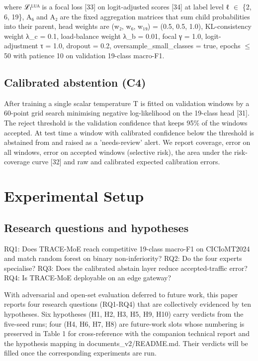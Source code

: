 \documentclass[11pt]{article}
\begin{document}
where ℒₗᴸᵁᴬ is a focal loss [33] on logit-adjusted scores [34] at label level ℓ $\in$ \{2, 6, 19\}, A₆ and A₂ are the fixed aggregation matrices that sum child probabilities into their parent, head weights are (w₂, w₆, w₁₉) = (0.5, 0.5, 1.0), KL-consistency weight λ\_c = 0.1, load-balance weight λ\_b = 0.01, focal γ = 1.0, logit-adjustment τ = 1.0, dropout = 0.2, oversample\_small\_classes = true, epochs $\leq$ 50 with patience 10 on validation 19-class macro-F1.

\subsection{Calibrated abstention (C4)}
After training a single scalar temperature T is fitted on validation windows by a 60-point grid search minimising negative log-likelihood on the 19-class head [31]. The reject threshold is the validation confidence that keeps 95\% of the windows accepted. At test time a window with calibrated confidence below the threshold is abstained from and raised as a 'needs-review' alert. We report coverage, error on all windows, error on accepted windows (selective risk), the area under the risk-coverage curve [32] and raw and calibrated expected calibration errors.

\section{Experimental Setup}
\subsection{Research questions and hypotheses}
RQ1: Does TRACE-MoE reach competitive 19-class macro-F1 on CICIoMT2024 and match random forest on binary non-inferiority? RQ2: Do the four experts specialise? RQ3: Does the calibrated abstain layer reduce accepted-traffic error? RQ4: Is TRACE-MoE deployable on an edge gateway?

With adversarial and open-set evaluation deferred to future work, this paper reports four research questions (RQ1-RQ4) that are collectively evidenced by ten hypotheses. Six hypotheses (H1, H2, H3, H5, H9, H10) carry verdicts from the five-seed runs; four (H4, H6, H7, H8) are future-work slots whose numbering is preserved in Table 1 for cross-reference with the companion technical report and the hypothesis mapping in documents\_v2/README.md. Their verdicts will be filled once the corresponding experiments are run.
\end{document}
